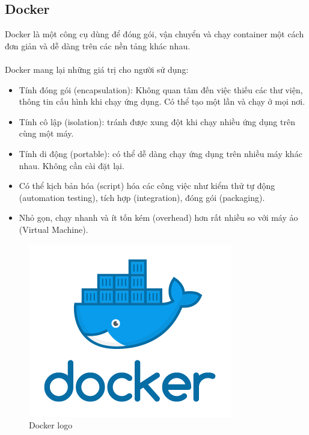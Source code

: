 \documentclass[11pt,a4paper]{article}
\begin{document}
\subsection{Docker\cite{DOCKER,docker}}
Docker là một công cụ dùng để đóng gói, vận chuyển và chạy container một cách đơn giản và dễ dàng trên các nền tảng khác nhau.\\
\\
Docker mang lại những giá trị cho người sử dụng:
\begin{itemize}
    \item Tính đóng gói (encapsulation): Không quan tâm đến việc thiếu các thư viện, thông tin cấu hình khi chạy ứng dụng. Có thể tạo một lần và chạy ở mọi nơi.
    \item Tính cô lập (isolation): tránh được xung đột khi chạy nhiều ứng dụng trên cùng một máy.
    \item Tính di động (portable): có thể dễ dàng chạy ứng dụng trên nhiều máy khác nhau. Không cần cài đặt lại.
    \item Có thể kịch bản hóa (script) hóa các công việc như kiểm thử tự động (automation testing), tích hợp (integration), đóng gói (packaging).
    \item Nhỏ gọn, chạy nhanh và ít tốn kém (overhead) hơn rất nhiều so với máy ảo (Virtual Machine).
\end{itemize}
\begin{figure}
    \centering
    \includegraphics{fig/docker_facebook_share.png}
    \caption{Docker logo}
    \label{fig:docker_logo}
\end{figure}
\newpage
\end{document}
